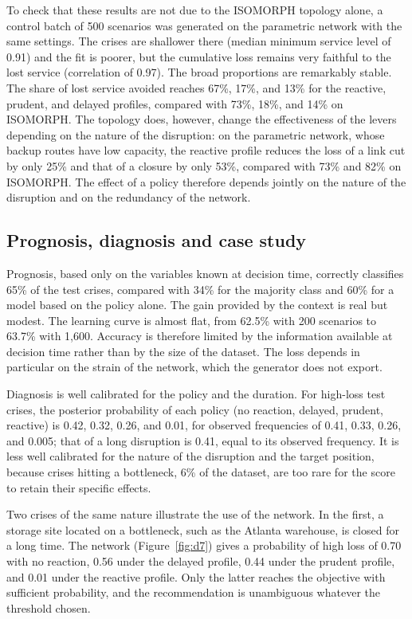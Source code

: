 To check that these results are not due to the ISOMORPH topology alone, a control batch of 500 scenarios was generated on the parametric network with the same settings. The crises are shallower there (median minimum service level of 0.91) and the fit is poorer, but the cumulative loss remains very faithful to the lost service (correlation of 0.97). The broad proportions are remarkably stable. The share of lost service avoided reaches 67\%, 17\%, and 13\% for the reactive, prudent, and delayed profiles, compared with 73\%, 18\%, and 14\% on ISOMORPH. The topology does, however, change the effectiveness of the levers depending on the nature of the disruption: on the parametric network, whose backup routes have low capacity, the reactive profile reduces the loss of a link cut by only 25\% and that of a closure by only 53\%, compared with 73\% and 82\% on ISOMORPH. The effect of a policy therefore depends jointly on the nature of the disruption and on the redundancy of the network.

\subsection{Prognosis, diagnosis and case study}
\label{sec:S6.3}

Prognosis, based only on the variables known at decision time, correctly classifies 65\% of the test crises, compared with 34\% for the majority class and 60\% for a model based on the policy alone. The gain provided by the context is real but modest. The learning curve is almost flat, from 62.5\% with 200 scenarios to 63.7\% with 1,600. Accuracy is therefore limited by the information available at decision time rather than by the size of the dataset. The loss depends in particular on the strain of the network, which the generator does not export.

Diagnosis is well calibrated for the policy and the duration. For high-loss test crises, the posterior probability of each policy (no reaction, delayed, prudent, reactive) is 0.42, 0.32, 0.26, and 0.01, for observed frequencies of 0.41, 0.33, 0.26, and 0.005; that of a long disruption is 0.41, equal to its observed frequency. It is less well calibrated for the nature of the disruption and the target position, because crises hitting a bottleneck, 6\% of the dataset, are too rare for the score to retain their specific effects.

Two crises of the same nature illustrate the use of the network. In the first, a storage site located on a bottleneck, such as the Atlanta warehouse, is closed for a long time. The network (Figure~\ref{fig:d7}) gives a probability of high loss of 0.70 with no reaction, 0.56 under the delayed profile, 0.44 under the prudent profile, and 0.01 under the reactive profile. Only the latter reaches the objective with sufficient probability, and the recommendation is unambiguous whatever the threshold chosen.

